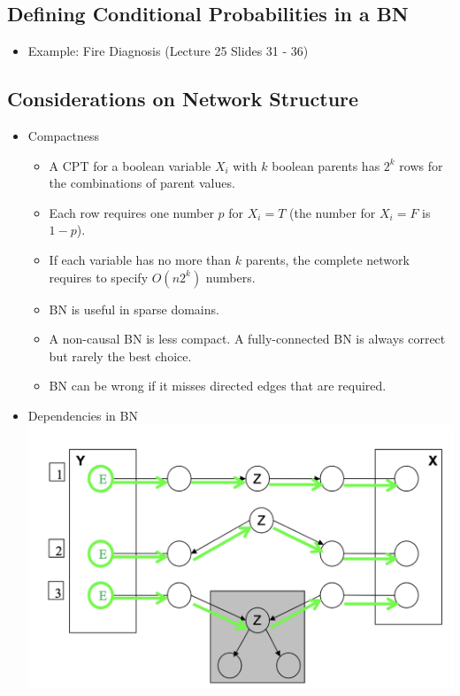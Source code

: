 \documentclass{article}
\begin{document}
\subsection{Defining Conditional Probabilities in a BN}

\begin{itemize}
    \item Example: Fire Diagnosis (Lecture 25 Slides 31 - 36)
\end{itemize}

\subsection{Considerations on Network Structure}

\begin{itemize}
    \item Compactness
        \begin{itemize}
            \item A CPT for a boolean variable $X_i$ with $k$ boolean parents has $2^k$ rows for the combinations of parent values.
            \item Each row requires one number $p$ for $X_i = T$ (the number for $X_i = F$ is $1 - p$).
            \item If each variable has no more than $k$ parents, the complete network requires to specify $O(n2^k)$ numbers.
            \item BN is useful in sparse domains.
            \item A non-causal BN is less compact. A fully-connected BN is always correct but rarely the best choice.
            \item BN can be wrong if it misses directed edges that are required.
        \end{itemize}
    \item Dependencies in BN \\
    \includegraphics[scale=0.5]{dependencies_in_bn}

\end{itemize}
\end{document}
